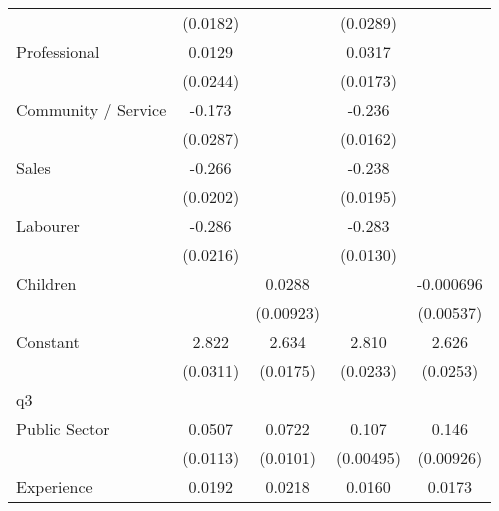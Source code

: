 {\begin{tabular}{l*{4}{c}}
                    &    (0.0182)         &                     &    (0.0289)         &                     \\
[1em]
Professional        &      0.0129         &                     &      0.0317         &                     \\
                    &    (0.0244)         &                     &    (0.0173)         &                     \\
[1em]
Community / Service &      -0.173\sym{***}&                     &      -0.236\sym{***}&                     \\
                    &    (0.0287)         &                     &    (0.0162)         &                     \\
[1em]
Sales               &      -0.266\sym{***}&                     &      -0.238\sym{***}&                     \\
                    &    (0.0202)         &                     &    (0.0195)         &                     \\
[1em]
Labourer            &      -0.286\sym{***}&                     &      -0.283\sym{***}&                     \\
                    &    (0.0216)         &                     &    (0.0130)         &                     \\
[1em]
Children            &                     &      0.0288\sym{**} &                     &   -0.000696         \\
                    &                     &   (0.00923)         &                     &   (0.00537)         \\
[1em]
Constant            &       2.822\sym{***}&       2.634\sym{***}&       2.810\sym{***}&       2.626\sym{***}\\
                    &    (0.0311)         &    (0.0175)         &    (0.0233)         &    (0.0253)         \\
\hline
q3                  &                     &                     &                     &                     \\
Public Sector       &      0.0507\sym{***}&      0.0722\sym{***}&       0.107\sym{***}&       0.146\sym{***}\\
                    &    (0.0113)         &    (0.0101)         &   (0.00495)         &   (0.00926)         \\
[1em]
Experience          &      0.0192\sym{***}&      0.0218\sym{***}&      0.0160\sym{***}&      0.0173\sym{***}\\

\end{tabular}}
